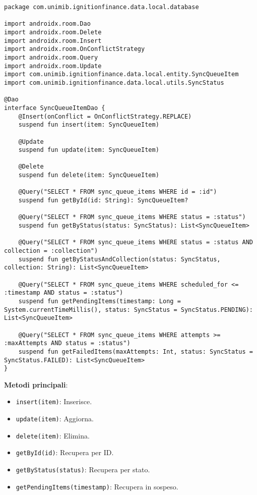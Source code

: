 \begin{lstlisting}[caption=SyncQueueItemDao.kt, label=lst:syncqueueitemdao, basicstyle=\ttfamily\scriptsize, breaklines=true, breakatwhitespace=true, tabsize=4]
package com.unimib.ignitionfinance.data.local.database

import androidx.room.Dao
import androidx.room.Delete
import androidx.room.Insert
import androidx.room.OnConflictStrategy
import androidx.room.Query
import androidx.room.Update
import com.unimib.ignitionfinance.data.local.entity.SyncQueueItem
import com.unimib.ignitionfinance.data.local.utils.SyncStatus

@Dao
interface SyncQueueItemDao {
    @Insert(onConflict = OnConflictStrategy.REPLACE)
    suspend fun insert(item: SyncQueueItem)

    @Update
    suspend fun update(item: SyncQueueItem)

    @Delete
    suspend fun delete(item: SyncQueueItem)

    @Query("SELECT * FROM sync_queue_items WHERE id = :id")
    suspend fun getById(id: String): SyncQueueItem?

    @Query("SELECT * FROM sync_queue_items WHERE status = :status")
    suspend fun getByStatus(status: SyncStatus): List<SyncQueueItem>

    @Query("SELECT * FROM sync_queue_items WHERE status = :status AND collection = :collection")
    suspend fun getByStatusAndCollection(status: SyncStatus, collection: String): List<SyncQueueItem>

    @Query("SELECT * FROM sync_queue_items WHERE scheduled_for <= :timestamp AND status = :status")
    suspend fun getPendingItems(timestamp: Long = System.currentTimeMillis(), status: SyncStatus = SyncStatus.PENDING): List<SyncQueueItem>

    @Query("SELECT * FROM sync_queue_items WHERE attempts >= :maxAttempts AND status = :status")
    suspend fun getFailedItems(maxAttempts: Int, status: SyncStatus = SyncStatus.FAILED): List<SyncQueueItem>
}
\end{lstlisting}

\textbf{Metodi principali}:
\begin{itemize}
    \item \texttt{insert(item)}: Inserisce.
    \item \texttt{update(item)}: Aggiorna.
    \item \texttt{delete(item)}: Elimina.
    \item \texttt{getById(id)}: Recupera per ID.
    \item \texttt{getByStatus(status)}: Recupera per stato.
    \item \texttt{getPendingItems(timestamp)}: Recupera in sospeso.
\end{itemize}

